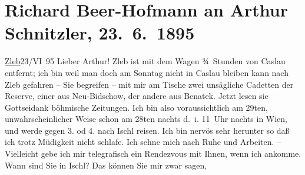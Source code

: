 

         
         \renewcommand{\erwaehntePersonen}{Personen: Hermann Bahr, Max Eugen Burckhard, Karl Lueger}
         \renewcommand{\erwaehnteOrte}{Orte: Bad Ischl, Benatek, Böhmen, Caslau, Nový Bydžov, Schleb, Wien}
         \renewcommand{\erwaehnteWerke}{Werke: Später Ruhm}
               \section[Richard Beer-Hofmann an Arthur Schnitzler, 23. 6. 1895]{ Richard Beer-Hofmann an Arthur Schnitzler, 23. 6. 1895}\nopagebreak{}\rehead{ }\begin{ledgroupsized}[t]{13cm}\normalsize\beginnumbering \toendnotes[C]{\smallbreak\pagebreak[2]} 
\pstart
           {\pb}\uline{Zleb}23/VI 95\pend
           \pstart
           Lieber Arthur!{ }Zleb ist mit dem Wagen ¾ Stunden von Caslau entfernt; ich bin weil man doch am
                  Sonntag nicht in Caslau bleiben
               kann nach Zleb gefahren – Sie begreifen – mit mir
               am Tische zwei unsägliche Cadetten der Reserve, einer aus Neu-Bidschow, der andere {\pb}aus Benatek. Jetzt lesen sie Gottseidank böhmische Zeitungen.\pend
           \pstart
           Ich bin also voraussichtlich am 29ten, unwahrscheinlicher Weise schon am
                  28ten{ }nachts d. i. 11 Uhr nachts in Wien, und werde gegen 3. od 4. nach Ischl reisen. Ich bin nervös sehr herunter {\pb}so daß ich trotz Müdigkeit nicht
               schlafe. Ich sehne mich nach Ruhe und Arbeiten. –\pend
           \pstart
           Vielleicht gebe ich mir telegrafisch ein Rendezvous mit Ihnen, wenn ich ankomme. Wann
               sind Sie in Ischl? Das können Sie mir zwar sagen,

\end{ledgroupsized}
